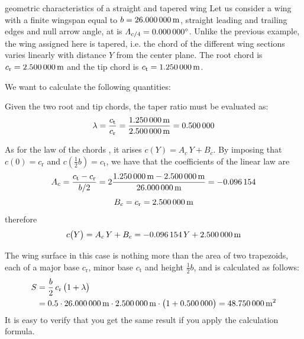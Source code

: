 \documentclass[[12pt,twoside]{book}
\begin{document}
\begin{myExampleX}{geometric characteristics of a straight and tapered wing}{}%
\label{example:Geometric:Characteristics:Of:A:Straight:And:Tapered:Wing}
%
\noindent
Let us consider a wing with a finite wingspan equal to $b=\SI[round-precision=1]{\mySpanWingMT}{\metre}$,
straight leading and trailing edges and
null arrow angle, at is $\Lambda_{c/4}=\SI[round-precision=0]{\myLambdaCQuarterDeg}{\degree}$.
Unlike the previous example, the wing assigned here is tapered, i.e.
the chord of the different wing sections varies linearly with distance $Y$ from the center plane.
The root chord is
%
$c_\mathrm{r}=\SI[round-precision=2]{\myChordRootWingMT}{\metre}$ and the tip chord is  
$c_\mathrm{t}=\SI[round-precision=2]{\myChordTipWingMT}{\metre}$.

We want to calculate the following quantities:

\noindent
{}%

\medskip
Given the two root and tip chords, the taper ratio must be evaluated as:
\[
\lambda
  =\frac{c_\mathrm{t}}{c_\mathrm{r}}
  =\frac{\SI[round-precision=2]{\myChordTipWingMT}{\metre}}{\SI[round-precision=2]{\myChordRootWingMT}{\metre}}
  = \SI[round-precision=2]{\myTaperRatioWing}{} 
\]

As for the law of the chords , it arises
$c ( Y ) = A_c \, Y + B_c$. By imposing that $c(0)=c_\mathrm{r}$ and $c(\frac{1}{2}b)=c_\mathrm{t}$,
we have that the coefficients of the linear law are
\[
A_c
  = \frac{c_\mathrm{t} - c_\mathrm{r}}{b/2}
  = 
    2 \frac{
      \SI[round-precision=2]{\myChordTipWingMT}{\metre} - \SI[round-precision=2]{\myChordRootWingMT}{\metre}
    }{
      \SI[round-precision=2]{\mySpanWingMT}{\metre}
    }
  =  \SI[round-precision=3]{\myCoefficientA}{} 
\]
\[
B_c
  = c_\mathrm{r}
  =  \SI[round-precision=2]{\myCoefficientB}{\metre} 
\]
therefore
\[
c \big( Y \big) = A_c \, Y + B_c
  = \SI[round-precision=3]{\myCoefficientA}{} \, Y
    + \SI[round-precision=2]{\myCoefficientB}{\metre}
\]

The wing surface in this case is nothing more than the area of two trapezoids,
each of a major base $c_\mathrm{r}$, minor base $c_\mathrm{t}$ and height $\frac{1}{2}b$,
and is calculated as follows:
\[
\begin{split}
S & {}= \frac{b}{2} \, c_\mathrm{r} \, \big( 1 + \lambda \big) \\
  & {}=
    \num{0.5} \cdot \SI[round-precision=1]{\mySpanWingMT}{\metre}
      \cdot \SI[round-precision=2]{\myChordRootWingMT}{\metre}
      \cdot \big( 1 + \SI[round-precision=2]{\myTaperRatioWing}{} \big) 
    =  \SI[round-precision=1]{\myAreaWingMTsquared}{\metre^2} 
\end{split}
\]
It is easy to verify that you get the same result if you apply the calculation formula.


\end{myExampleX}
\end{document}
